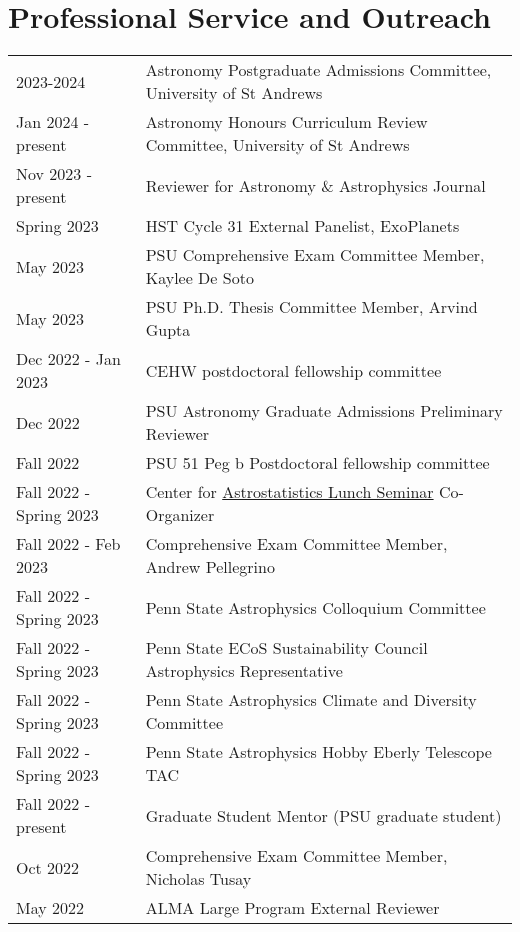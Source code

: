 \section*{Professional Service and Outreach}
\begin{tabular*}{\textwidth}{@{\hspace{10pt}}p{1.4in}l}
2023-2024 & Astronomy Postgraduate Admissions Committee, University of St Andrews \\
Jan 2024 - present & Astronomy Honours Curriculum Review Committee, University of St Andrews \\
Nov 2023 - present & Reviewer for Astronomy \& Astrophysics Journal \\
Spring 2023 & HST Cycle 31 External Panelist, ExoPlanets \\
May 2023 & PSU Comprehensive Exam Committee Member, Kaylee De Soto \\    
May 2023 & PSU Ph.D. Thesis Committee Member, Arvind Gupta\\
Dec 2022 - Jan 2023 & CEHW postdoctoral fellowship committee \\
Dec 2022 & PSU Astronomy Graduate Admissions Preliminary Reviewer \\
Fall 2022 & PSU 51 Peg b Postdoctoral fellowship committee \\
Fall 2022 - Spring 2023 & Center for \href{https://sites.psu.edu/astrostatistics/cast-lunch-meetings/}{Astrostatistics Lunch Seminar} Co-Organizer \\
Fall 2022 - Feb 2023 & Comprehensive Exam Committee Member, Andrew Pellegrino \\    
Fall 2022 - Spring 2023 & Penn State Astrophysics Colloquium Committee \\
Fall 2022 - Spring 2023 & Penn State ECoS Sustainability Council Astrophysics Representative \\
Fall 2022 - Spring 2023 & Penn State Astrophysics Climate and Diversity Committee \\
Fall 2022 - Spring 2023 & Penn State Astrophysics Hobby Eberly Telescope TAC \\
Fall 2022 - present & Graduate Student Mentor (PSU graduate student) \\ %
Oct 2022 & Comprehensive Exam Committee Member, Nicholas Tusay \\
May 2022 & ALMA Large Program External Reviewer \\

\end{tabular*}

